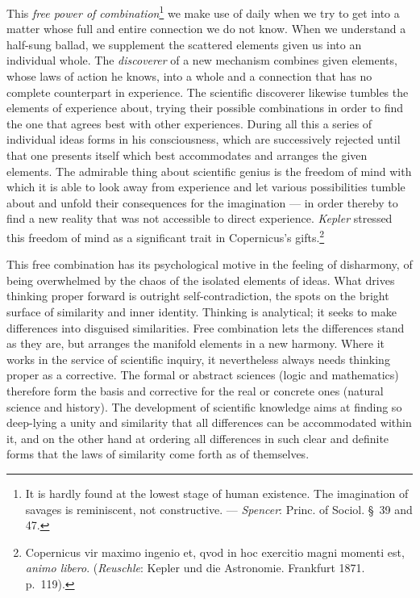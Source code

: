 \documentclass[12pt,a4paper]{book}
\newcommand{\opage}[1]{\marginnote{\footnotesize\textit{[#1]}}}
\begin{document}
This \emph{free power of combination}\footnote{It is hardly found at the
lowest stage of human existence. The imagination of savages is
reminiscent, not constructive. --- \emph{Spencer}: Princ. of Sociol.
§~39 and 47.} we make use of daily when we try to get into a matter
whose full and entire connection we do not know. When we understand a
half-sung ballad, we supplement the scattered elements given us into an
individual whole.
The \emph{discoverer} of a new mechanism combines given elements, whose
laws of action he knows, into a whole and a connection that has no
complete counterpart in experience. The scientific discoverer likewise
tumbles the elements of experience about, trying their possible
combinations in order to find the one that agrees best with other
experiences. During all this a series of individual ideas forms in his
consciousness, which are successively rejected until that one presents
itself which best accommodates and arranges the given elements. The
admirable thing about scientific genius is the freedom of mind with
which it is able to look away from experience and let various
possibilities tumble about and unfold their consequences for the
imagination --- in order thereby to find a new reality that was not
accessible to direct experience. \emph{Kepler} stressed this freedom of
mind as a significant trait in Copernicus's
gifts.\footnote{Copernicus vir maximo ingenio et, qvod in hoc exercitio
magni momenti est, \emph{animo libero}. (\emph{Reuschle}: Kepler und die
Astronomie. Frankfurt 1871. p.~119).}

This free combination has its psychological motive in the feeling of
disharmony, of being overwhelmed by the chaos of the isolated elements
of ideas. What drives thinking proper forward is outright
self-contradiction, the spots on the bright surface of similarity and
inner identity. Thinking is analytical; it seeks to make differences
into disguised similarities. Free combination lets the differences stand
as they are, but arranges the manifold elements in a new
\opage{223}harmony. Where it works in the service of scientific inquiry,
it nevertheless always needs thinking proper as a corrective. The formal
or abstract sciences (logic and mathematics) therefore form the basis
and corrective for the real or concrete ones (natural science and
history). The development of scientific knowledge aims at finding so
deep-lying a unity and similarity that all differences can be
accommodated within it, and on the other hand at ordering all
differences in such clear and definite forms that the laws of similarity
come forth as of themselves.
\end{document}
